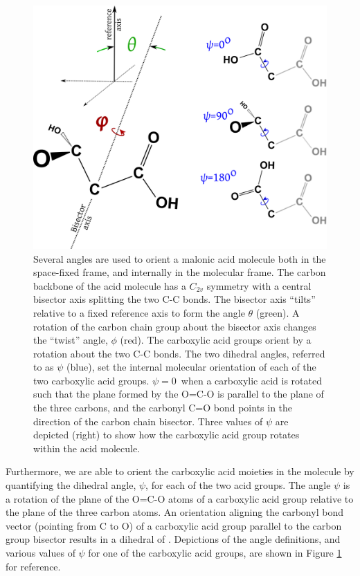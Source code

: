 \begin{figure}[h!]
	\begin{center}
		\includegraphics[scale=1.0]{images/orientation/malonic-angle-definitions.png}
		\caption{Several angles are used to orient a malonic acid molecule both in the space-fixed frame, and internally in the molecular frame. The carbon backbone of the acid molecule has a $C_{2v}$ symmetry with a central bisector axis splitting the two C-C bonds. The bisector axis ``tilts'' relative to a fixed reference axis to form the angle $\theta$ (green). A rotation of the carbon chain group about the bisector axis changes the ``twist'' angle, $\phi$ (red). The carboxylic acid groups orient by a rotation about the two C-C bonds. The two dihedral angles, referred to as $\psi$ (blue), set the internal molecular orientation of each of the two carboxylic acid groups. $\psi=0$\textdegree~when a carboxylic acid is rotated such that the plane formed by the O=C-O is parallel to the plane of the three carbons, and the carbonyl C=O bond points in the direction of the carbon chain bisector. Three values of $\psi$ are depicted (right) to show how the carboxylic acid group rotates within the acid molecule.}
		\label{fig:angle-definitions}
	\end{center}
\end{figure}


Furthermore, we are able to orient the carboxylic acid moieties in the molecule by quantifying the dihedral angle, $\psi$, for each of the two acid groups. The angle $\psi$ is a rotation of the plane of the O=C-O atoms of a carboxylic acid group relative to the plane of the three carbon atoms. An orientation aligning the carbonyl bond vector (pointing from C to O) of a carboxylic acid group parallel to the carbon group bisector results in a dihedral of \degr. Depictions of the angle definitions, and various values of $\psi$ for one of the carboxylic acid groups, are shown in Figure \ref{fig:angle-definitions} for reference.

